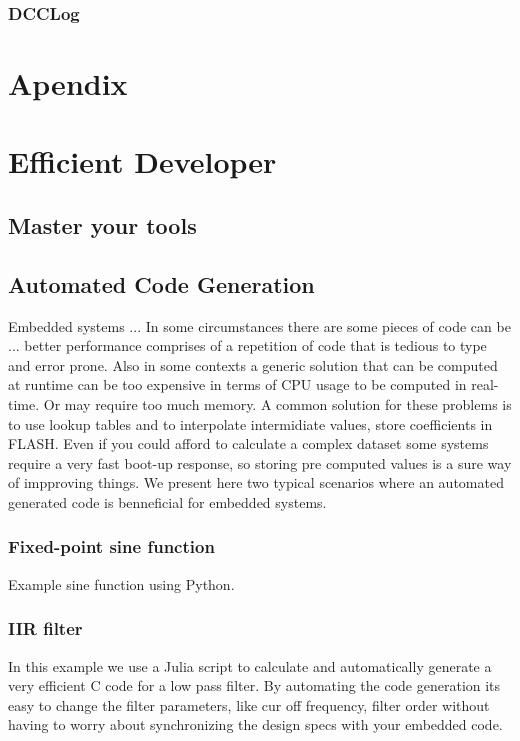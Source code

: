 \subsubsection{DCCLog}

\section{Apendix}

\section{Efficient Developer}

\subsection{Master your tools}

\subsection{Automated Code Generation}

Embedded systems ...
In some circumstances there are some pieces of code can be ...
better performance comprises of a repetition of code that is tedious to type and error prone. Also in some contexts a generic solution that can be computed at runtime can be too expensive in terms of CPU usage to be computed in real-time. Or may require too much memory. A common solution for these problems is to use lookup tables and to interpolate intermidiate values, store coefficients in FLASH.
Even if you could afford to calculate a complex dataset some systems require a very fast boot-up response, so storing pre computed values is a sure way of impproving things.
We present here two typical scenarios where an automated generated code is benneficial for embedded systems.

\subsubsection{Fixed-point sine function}

Example sine function using Python.


\subsubsection{IIR filter}

In this example we use a Julia script to calculate and automatically generate a very efficient C code for a low pass filter. By automating the code generation its easy to change the filter parameters, like cur off frequency, filter order without having to worry about synchronizing the design specs with your embedded code.

